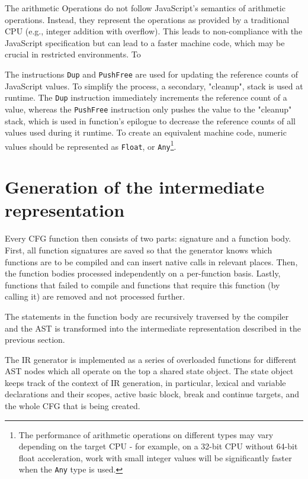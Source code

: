 The arithmetic Operations do not follow JavaScript's semantics of arithmetic operations. Instead, they represent the operations as provided by a traditional CPU (e.g., integer addition with overflow). This leads to non-compliance with the JavaScript specification but can lead to a faster machine code, which may be crucial in restricted environments. To

The instructions \texttt{Dup} and \texttt{PushFree} are used for updating the reference counts of JavaScript values. To simplify the process, a secondary, "cleanup", stack is used at runtime. The \texttt{Dup} instruction immediately increments the reference count of a value, whereas the \texttt{PushFree} instruction only pushes the value to the "cleanup" stack, which is used in function's epilogue to decrease the reference counts of all values used during it runtime. To create an equivalent machine code, numeric values should be represented as \texttt{Float}, or \texttt{Any}\footnote{The performance of arithmetic operations on different types may vary depending on the target CPU - for example, on a 32-bit CPU without 64-bit float acceleration, work with small integer values will be significantly faster when the \texttt{Any} type is used.}.


\section{Generation of the intermediate representation}

Every CFG function then consists of two parts: signature and a function body. First, all function signatures are saved so that the generator knows which functions are to be compiled and can insert native calls in relevant places. Then, the function bodies processed independently on a per-function basis. Lastly, functions that failed to compile and functions that require this function (by calling it) are removed and not processed further.

The statements in the function body are recursively traversed by the compiler and the AST is transformed into the intermediate representation described in the previous section.

The IR generator is implemented as a series of overloaded functions for different AST nodes which all operate on the top a shared state object. The state object keeps track of the context of IR generation, in particular, lexical and variable declarations and their scopes, active basic block, break and continue targets, and the whole CFG that is being created.


